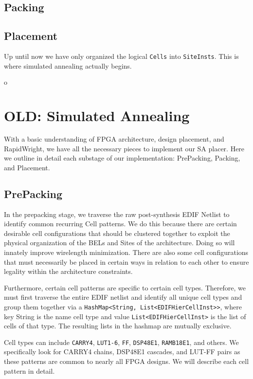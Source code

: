 \documentclass{article}
\begin{document}
\begin{multicols}{2}
    \subsection{Packing}
        \label{subsec:packing}

    \subsection{Placement}
        \label{subsec:placement}
        Up until now we have only organized the logical \texttt{Cells} into \texttt{SiteInsts}. 
        This is where simulated annealing actually begins. 


\newpage
o
\newpage

\section{OLD: Simulated Annealing}
    With a basic understanding of FPGA architecture, design placement, and RapidWright, we have all the necessary pieces to implement our SA placer. 
    Here we outline in detail each substage of our implementation: PrePacking, Packing, and Placement. 


    \subsection{PrePacking}
        In the prepacking stage, we traverse the raw post-synthesis EDIF Netlist to identify common recurring Cell patterns. 
        We do this because there are certain desirable cell configurations that should be clustered together to exploit the physical organization of the BELs and Sites of the architecture. 
        Doing so will innately improve wirelength minimization. 
        There are also some cell configurations that must necessarily be placed in certain ways in relation to each other to ensure legality within the architecture constraints. 

        Furthermore, certain cell patterns are specific to certain cell types. 
        Therefore, we must first traverse the entire EDIF netlist and identify all unique cell types and group them together via a {\tt HashMap<String, List<EDIFHierCellInst>>}, where key String is the name cell type and value {\tt List<EDIFHierCellInst>} is the list of cells of that type. 
        The resulting lists in the hashmap are mutually exclusive. 

        Cell types can include {\tt CARRY4}, {\tt LUT1-6}, {\tt FF}, {\tt DSP48E1}, {\tt RAMB18E1}, and others. 
        We specifically look for CARRY4 chains, DSP48E1 cascades, and LUT-FF pairs as these patterns are common to nearly all FPGA designs. 
        We will describe each cell pattern in detail. 


\end{multicols}
\end{document}
